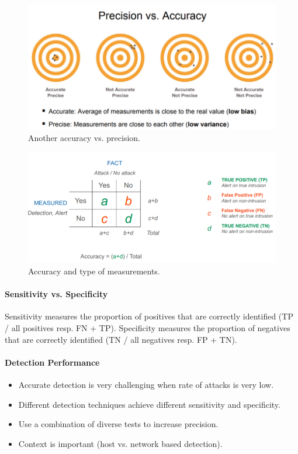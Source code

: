 \begin{figure}[h]
	\centering
	\includegraphics[scale=0.6]{images/911-another.PNG}
	\caption{Another accuracy vs. precision.}
	\label{fig:another}
\end{figure}

\begin{figure}[h]
	\centering
	\includegraphics[scale=0.8]{images/911-positives.PNG}
	\caption{Accuracy and type of measurements.}
	\label{fig:positives}
\end{figure}

\paragraph{Sensitivity vs. Specificity}
Sensitivity measures the proportion of positives that are correctly identified (TP / all positives resp. FN + TP). Specificity measures the proportion of negatives that are correctly identified (TN / all negatives resp. FP + TN).

\paragraph{Detection Performance}
\begin{itemize}
    \item Accurate detection is very challenging when rate of attacks is very low.
    \item Different detection techniques achieve different sensitivity and specificity.
    \item Use a combination of diverse tests to increase precision.
    \item Context is important (host vs. network based detection).
\end{itemize}

